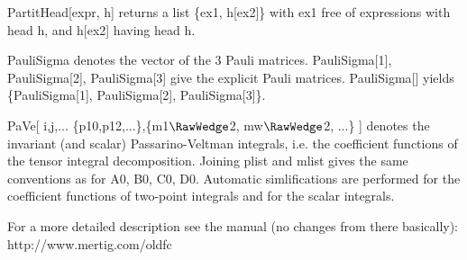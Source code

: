 








PartitHead[expr, h] returns a list \{ex1, h[ex2]\} with ex1 free of expressions with head h, and h[ex2] having head h.



PauliSigma denotes the vector of the 3 Pauli matrices. PauliSigma[1], PauliSigma[2], PauliSigma[3] give the explicit Pauli matrices.
  PauliSigma[] yields \{PauliSigma[1], PauliSigma[2], PauliSigma[3]\}.





 PaVe[ i,j,... \{p10,p12,...\},\{m1\(\RawWedge\)2, mw\(\RawWedge\)2, ...\} ] denotes the invariant (and scalar) Passarino-Veltman
  integrals, i.e. the coefficient functions of the tensor integral decomposition. Joining plist and mlist gives the same conventions as
  for A0, B0, C0, D0. Automatic simlifications are performed for the coefficient functions of two-point integrals and for the scalar
  integrals.

For a more detailed description see the manual (no changes from there basically): http://www.mertig.com/oldfc

